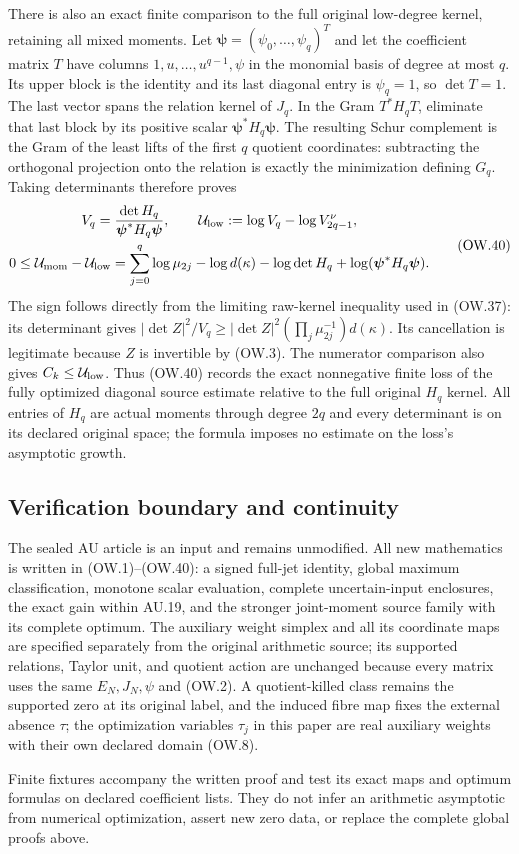 There is also an exact finite comparison to the full original low-degree
kernel, retaining all mixed moments. Let
$\boldsymbol\psi=(\psi_0,\ldots,\psi_q)^T$ and let the coefficient
matrix $T$ have columns $1,u,\ldots,u^{q-1},\psi$ in the monomial
basis of degree at most $q$. Its upper block is the identity and its
last diagonal entry is $\psi_q=1$, so $\det T=1$. The last vector
spans the relation kernel of $J_q$. In the Gram $T^*H_qT$, eliminate
that last block by its positive scalar
$\boldsymbol\psi^*H_q\boldsymbol\psi$. The resulting Schur complement
is the Gram of the least lifts of the first $q$ quotient coordinates:
subtracting the orthogonal projection onto the relation is exactly
the minimization defining $G_q$. Taking determinants therefore proves
\[
 \begin{gathered}
 V_q=\frac{\det H_q}{\boldsymbol\psi^*H_q\boldsymbol\psi},\qquad
 \mathcal U_{\rm low}:=\log V_q-\log V_{2q-1}^\nu,\\
 0\le\mathcal U_{\rm mom}-\mathcal U_{\rm low}
  =\sum_{j=0}^q\log\mu_{2j}-\log d(\kappa)-\log\det H_q
             +\log(\boldsymbol\psi^*H_q\boldsymbol\psi).
 \end{gathered}                                                \tag{OW.40}
\]
The sign follows directly from the limiting raw-kernel inequality used
in (OW.37): its determinant gives
$|\det Z|^2/V_q\ge|\det Z|^2
(\prod_j\mu_{2j}^{-1})d(\kappa)$.
Its cancellation is legitimate because $Z$ is invertible by (OW.3).
The numerator comparison also gives $C_k\le\mathcal U_{\rm low}$.
Thus (OW.40) records the exact nonnegative finite loss of the fully
optimized diagonal source estimate relative to the full original
$H_q$ kernel. All entries of $H_q$ are actual moments through degree
$2q$ and every determinant is on its declared original space; the
formula imposes no estimate on the loss's asymptotic growth.

\subsection{Verification boundary and continuity}

The sealed AU article is an input and remains unmodified. All new
mathematics is written in (OW.1)--(OW.40): a signed full-jet identity,
global maximum classification, monotone scalar evaluation, complete
uncertain-input enclosures, the exact gain within AU.19, and the stronger
joint-moment source family with its complete optimum. The auxiliary
weight simplex and all its coordinate maps are specified separately
from the original arithmetic source; its supported relations, Taylor
unit, and quotient action are unchanged because every matrix uses
the same $E_N,J_N,\psi$ and (OW.2). A quotient-killed class remains
the supported zero at its original label, and the induced fibre map
fixes the external absence $\tau$; the optimization variables
$\tau_j$ in this paper are real auxiliary weights with their own
declared domain (OW.8).

Finite fixtures accompany the written proof and test its exact maps
and optimum formulas on declared coefficient lists. They do not
infer an arithmetic asymptotic from numerical optimization, assert
new zero data, or replace the complete global proofs above.


\endgroup
